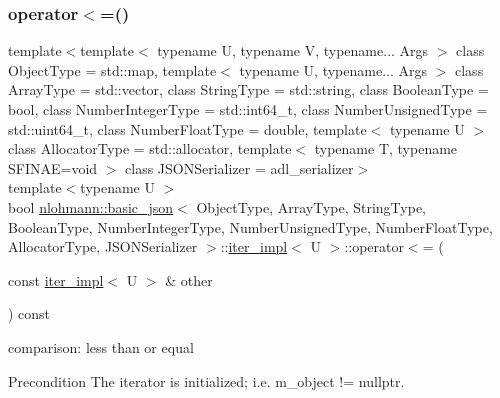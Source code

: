 \subsubsection{\texorpdfstring{operator$<$=()}{operator<=()}}
{\footnotesize\ttfamily template$<$template$<$ typename U, typename V, typename... Args $>$ class Object\+Type = std\+::map, template$<$ typename U, typename... Args $>$ class Array\+Type = std\+::vector, class String\+Type  = std\+::string, class Boolean\+Type  = bool, class Number\+Integer\+Type  = std\+::int64\+\_\+t, class Number\+Unsigned\+Type  = std\+::uint64\+\_\+t, class Number\+Float\+Type  = double, template$<$ typename U $>$ class Allocator\+Type = std\+::allocator, template$<$ typename T, typename S\+F\+I\+N\+A\+E=void $>$ class J\+S\+O\+N\+Serializer = adl\+\_\+serializer$>$ \\
template$<$typename U $>$ \\
bool \hyperlink{classnlohmann_1_1basic__json}{nlohmann\+::basic\+\_\+json}$<$ Object\+Type, Array\+Type, String\+Type, Boolean\+Type, Number\+Integer\+Type, Number\+Unsigned\+Type, Number\+Float\+Type, Allocator\+Type, J\+S\+O\+N\+Serializer $>$\+::\hyperlink{classnlohmann_1_1basic__json_1_1iter__impl}{iter\+\_\+impl}$<$ U $>$\+::operator$<$= (\begin{DoxyParamCaption}\item[{const \hyperlink{classnlohmann_1_1basic__json_1_1iter__impl}{iter\+\_\+impl}$<$ U $>$ \&}]{other }\end{DoxyParamCaption}) const\hspace{0.3cm}{\ttfamily [inline]}}



comparison\+: less than or equal 

\begin{DoxyPrecond}{Precondition}
The iterator is initialized; i.\+e. {\ttfamily m\+\_\+object != nullptr}. 
\end{DoxyPrecond}
\mbox{\label{classnlohmann_1_1basic__json_1_1iter__impl_a083d9d5465de7ddfb6108f404ce54be3}} 
